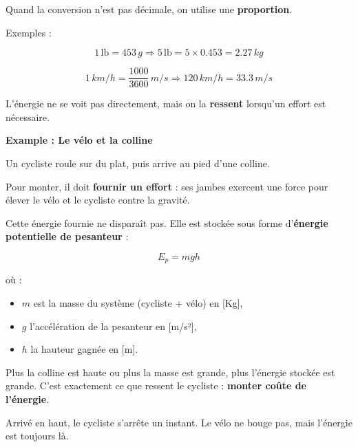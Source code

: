 \documentclass[11pt,a4paper]{article}
\newcommand{\theorybox}[2]{
\begin{tcolorbox}[title=\textbf{#1}]
#2
\end{tcolorbox}
}
\begin{document}
\theorybox{F - Conversion par proportion (cas général)}{
Quand la conversion n’est pas décimale, on utilise une \textbf{proportion}.

Exemples :

\[
1\,\text{lb} = 453\,\si{g}
\Rightarrow
5\,\text{lb} = 5 \times 0.453 = 2.27\,\si{kg}
\]

\[
1\,\si{km/h} = \frac{1000}{3600}\,\si{m/s}
\Rightarrow
120\,\si{km/h} = 33.3\,\si{m/s}
\]
}



\theorybox{G - Définition de l’énergie (intuition physique)}{

L’énergie ne se voit pas directement, mais on la \textbf{ressent} lorsqu’un effort est nécessaire.

\vspace{0.2cm}

\textbf{Example : Le vélo et la colline}

\vspace{0.2cm}

Un cycliste roule sur du plat, puis arrive au pied d’une colline.

Pour monter, il doit \textbf{fournir un effort} :  
ses jambes exercent une force pour élever le vélo et le cycliste contre la gravité.

Cette énergie fournie ne disparaît pas.  
Elle est stockée sous forme d’\textbf{énergie potentielle de pesanteur} :

\[
E_p = m g h
\]

où :
\begin{itemize}
\item $m$ est la masse du système (cycliste + vélo) en [Kg],
\item $g$ l’accélération de la pesanteur en [m/s²],
\item $h$ la hauteur gagnée en [m].
\end{itemize}

Plus la colline est haute ou plus la masse est grande, plus l’énergie stockée est grande.  
C’est exactement ce que ressent le cycliste : \textbf{monter coûte de l’énergie}.

\vspace{0.3cm}

Arrivé en haut, le cycliste s’arrête un instant.  
Le vélo ne bouge pas, mais l’énergie est toujours là.

\vspace{0.2cm}

}
\end{document}
